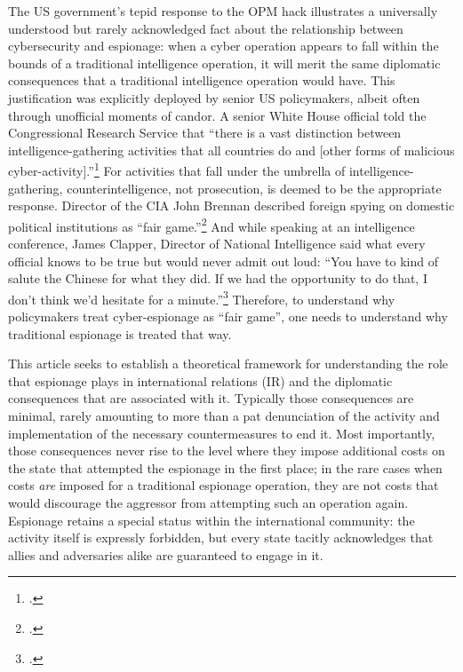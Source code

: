 \documentclass[14pt]{extarticle}
\begin{document}
The US government's tepid response to the OPM hack illustrates a universally understood but rarely acknowledged fact about the relationship between cybersecurity and espionage: when a cyber operation appears to fall within the bounds of a traditional intelligence operation, it will merit the same diplomatic consequences that a traditional intelligence operation would have. This justification was explicitly deployed by senior US policymakers, albeit often through unofficial moments of candor. A senior White House official told the Congressional Research Service that \enquote{there is a vast distinction between intelligence-gathering activities that all countries do and [other forms of malicious cyber-activity].}\footcite[In the context of the quote, the White House official is distinguishing between traditional espionage and economic espionage, the latter of which is the state-sponsored theft of trade secrets from foreign private companies in order to gain a competitive advantage in international markets.]{finklea_cyber_2015} For activities that fall under the umbrella of intelligence-gathering, counterintelligence, not prosecution, is deemed to be the appropriate response. Director of the CIA John Brennan described foreign spying on domestic political institutions as \enquote{fair game.}\footcite{sanger_u.s._2016} And while speaking at an intelligence conference, James Clapper, Director of National Intelligence said what every official knows to be true but would never admit out loud: \enquote{You have to kind of salute the Chinese for what they did. If we had the opportunity to do that, I don’t think we’d hesitate for a minute.}\footcite{pepitone_clapper_2015} Therefore, to understand why policymakers treat cyber-espionage as \enquote{fair game}, one needs to understand why traditional espionage is treated that way.

This article seeks to establish a theoretical framework for understanding the role that espionage plays in international relations (IR) and the diplomatic consequences that are associated with it. Typically those consequences are minimal, rarely amounting to more than a pat denunciation of the activity and implementation of the necessary countermeasures to end it. Most importantly, those consequences never rise to the level where they impose additional costs on the state that attempted the espionage in the first place; in the rare cases when costs \emph{are} imposed for a traditional espionage operation, they are not costs that would discourage the aggressor from attempting such an operation again. Espionage retains a special status within the international community: the activity itself is expressly forbidden, but every state tacitly acknowledges that allies and adversaries alike are guaranteed to engage in it.
\end{document}
